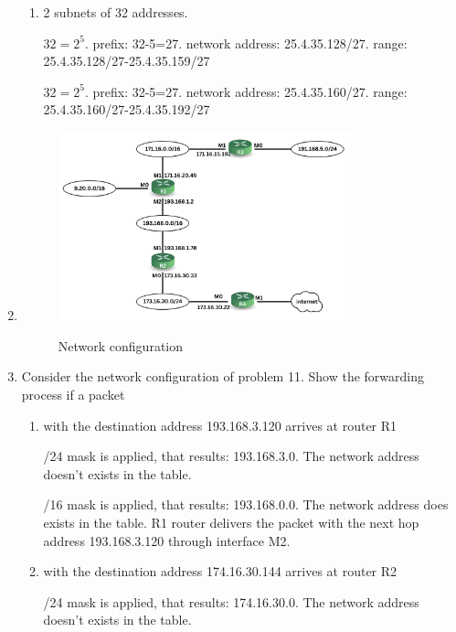 \documentclass{article}
\begin{document}
\begin{enumerate}
\begin{enumerate}
    \item 2 subnets of 32 addresses.

    $32=2^{5}$. prefix: 32-5=27. network address: 25.4.35.128/27. range: 25.4.35.128/27-25.4.35.159/27

    $32=2^{5}$. prefix: 32-5=27. network address: 25.4.35.160/27. range: 25.4.35.160/27-25.4.35.192/27

  \end{enumerate}
  
  \item
  
  \begin{figure}[H]
    \centering
    \includegraphics[width=0.8\textwidth]{question11.png}
    \begin{minipage}{0.8\textwidth}
        \centering
        Network configuration
    \end{minipage}
  \end{figure}

  \item Consider the network configuration of problem 11. Show the forwarding process if a packet
  \begin{enumerate}
    \item with the destination address 193.168.3.120 arrives at router R1

    /24 mask is applied, that results: 193.168.3.0. The network address doesn't exists in the table.

    /16 mask is applied, that results: 193.168.0.0. The network address does exists in the table.
    R1 router delivers the packet with the next hop address 193.168.3.120 through interface M2.

    \item with the destination address 174.16.30.144 arrives at router R2

    /24 mask is applied, that results: 174.16.30.0. The network address doesn't exists in the table.


\end{enumerate}
\end{enumerate}
\end{document}
